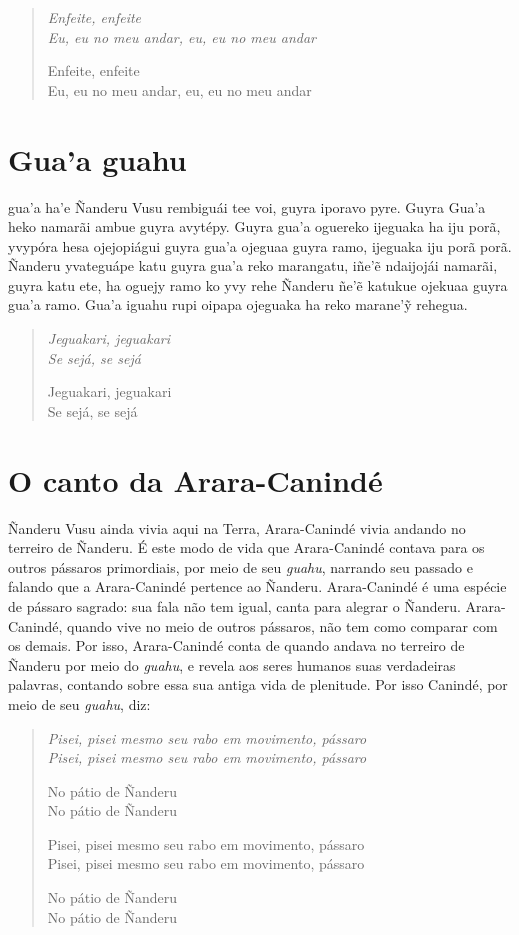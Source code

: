 \begin{verse}
\itshape
Enfeite, enfeite\\
Eu, eu no meu andar, eu, eu no meu andar

Enfeite, enfeite\\
Eu, eu no meu andar, eu, eu no meu andar
\end{verse}

\chapter{Gua’a guahu}

 gua'a ha'e Ñanderu Vusu rembiguái tee voi, guyra iporavo pyre.
Guyra Gua'a heko namarãi ambue guyra avytépy. Guyra gua'a oguereko
ijeguaka ha iju porã, yvypóra hesa ojejopiágui guyra gua'a ojeguaa guyra
ramo, ijeguaka iju porã porã. Ñanderu yvateguápe katu guyra gua'a reko
marangatu, iñe'ẽ ndaijojái namarãi, guyra katu ete, ha oguejy ramo ko
yvy rehe Ñanderu ñe'ẽ katukue ojekuaa guyra gua'a ramo. Gua'a iguahu
rupi oipapa ojeguaka ha reko marane'ỹ rehegua.

\begin{verse}
\itshape
Jeguakari, jeguakari\\
Se sejá, se sejá

Jeguakari, jeguakari\\
Se sejá, se sejá
\end{verse}

\chapter{O canto da Arara-Canindé}

 Ñanderu Vusu ainda vivia aqui na Terra, Arara-Canindé vivia
andando no terreiro de Ñanderu. É este modo de vida que Arara-Canindé
contava para os outros pássaros primordiais, por meio de seu
\emph{guahu}, narrando seu passado e falando que a Arara-Canindé
pertence ao Ñanderu. Arara-Canindé é uma espécie de pássaro sagrado: sua
fala não tem igual, canta para alegrar o Ñanderu. Arara-Canindé, quando
vive no meio de outros pássaros, não tem como comparar com os demais.
Por isso, Arara-Canindé conta de quando andava no terreiro de Ñanderu
por meio do \emph{guahu}, e revela aos seres humanos suas verdadeiras
palavras, contando sobre essa sua antiga vida de plenitude. Por isso
Canindé, por meio de seu \emph{guahu}, diz:

\begin{verse}
\itshape
Pisei, pisei mesmo seu rabo em movimento, pássaro\\
Pisei, pisei mesmo seu rabo em movimento, pássaro

No pátio de Ñanderu\\
No pátio de Ñanderu

Pisei, pisei mesmo seu rabo em movimento, pássaro\\
Pisei, pisei mesmo seu rabo em movimento, pássaro

No pátio de Ñanderu\\
No pátio de Ñanderu
\end{verse}

